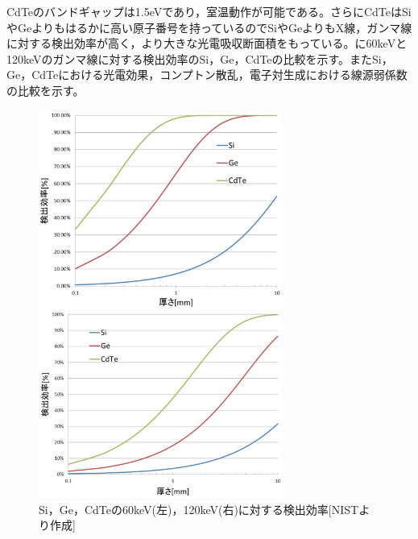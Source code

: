 CdTeのバンドギャップは1.5eVであり，室温動作が可能である。さらにCdTeはSiやGeよりもはるかに高い原子番号を持っているのでSiやGeよりもX線，ガンマ線に対する検出効率が高く，より大きな光電吸収断面積をもっている。に60keVと120keVのガンマ線に対する検出効率のSi，Ge，CdTeの比較を示す。またSi，Ge，CdTeにおける光電効果，コンプトン散乱，電子対生成における線源弱係数の比較を示す。

\begin{figure}[H]
\begin{minipage}{0.5\hsize}
 \begin{center}
 \includegraphics[width=8cm]{image/other/PDE_60.eps}
 \end{center}
 \end{minipage}
 \begin{minipage}{0.5\hsize}
 \begin{center}
 \includegraphics[width=8cm]{image/other/PDE_122.eps}
 \end{center}
  \end{minipage}
 \caption{Si，Ge，CdTeの60keV(左)，120keV(右)に対する検出効率[NIST\cite{nist}より作成]}
 \label{fig:efficiency}
\end{figure}

